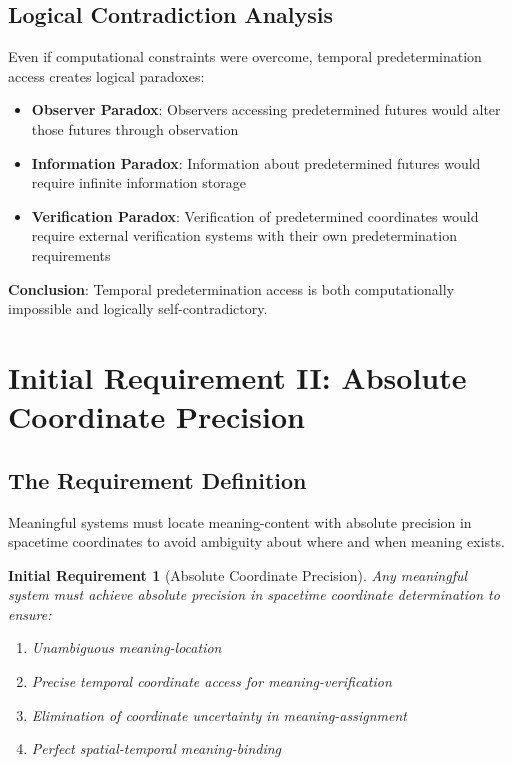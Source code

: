 \documentclass[12pt,a4paper]{article}
\newtheorem{requirement}[theorem]{Initial Requirement}
\begin{document}
\subsection{Logical Contradiction Analysis}

Even if computational constraints were overcome, temporal predetermination access creates logical paradoxes:

\begin{itemize}
\item \textbf{Observer Paradox}: Observers accessing predetermined futures would alter those futures through observation
\item \textbf{Information Paradox}: Information about predetermined futures would require infinite information storage
\item \textbf{Verification Paradox}: Verification of predetermined coordinates would require external verification systems with their own predetermination requirements
\end{itemize}

\textbf{Conclusion}: Temporal predetermination access is both computationally impossible and logically self-contradictory.

\section{Initial Requirement II: Absolute Coordinate Precision}

\subsection{The Requirement Definition}

Meaningful systems must locate meaning-content with absolute precision in spacetime coordinates to avoid ambiguity about where and when meaning exists.

\begin{requirement}[Absolute Coordinate Precision]
Any meaningful system must achieve absolute precision in spacetime coordinate determination to ensure:
\begin{enumerate}
\item Unambiguous meaning-location
\item Precise temporal coordinate access for meaning-verification
\item Elimination of coordinate uncertainty in meaning-assignment
\item Perfect spatial-temporal meaning-binding
\end{enumerate}
\end{requirement}
\end{document}
